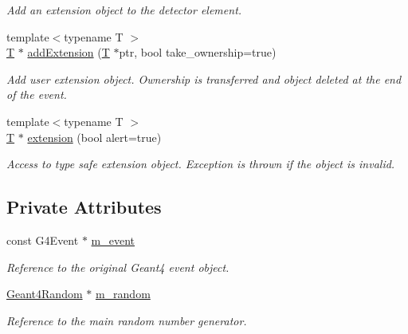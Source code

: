 \begin{DoxyCompactItemize}
\begin{DoxyCompactList}\small\item\em Add an extension object to the detector element. \end{DoxyCompactList}\item 
{\footnotesize template$<$typename T $>$ }\\\hyperlink{class_t}{T} $\ast$ \hyperlink{class_d_d4hep_1_1_simulation_1_1_geant4_event_ab36b9e314cbcaa56851c712ba7d0db51}{add\+Extension} (\hyperlink{class_t}{T} $\ast$ptr, bool take\+\_\+ownership=true)
\begin{DoxyCompactList}\small\item\em Add user extension object. Ownership is transferred and object deleted at the end of the event. \end{DoxyCompactList}\item 
{\footnotesize template$<$typename T $>$ }\\\hyperlink{class_t}{T} $\ast$ \hyperlink{class_d_d4hep_1_1_simulation_1_1_geant4_event_a9484d88af250ffabccc8d717b6055ef7}{extension} (bool alert=true)
\begin{DoxyCompactList}\small\item\em Access to type safe extension object. Exception is thrown if the object is invalid. \end{DoxyCompactList}\end{DoxyCompactItemize}
\subsection*{Private Attributes}
\begin{DoxyCompactItemize}
\item 
const G4\+Event $\ast$ \hyperlink{class_d_d4hep_1_1_simulation_1_1_geant4_event_a1d336fefbd6316dc5373a3b2d362cffa}{m\+\_\+event}
\begin{DoxyCompactList}\small\item\em Reference to the original Geant4 event object. \end{DoxyCompactList}\item 
\hyperlink{class_d_d4hep_1_1_simulation_1_1_geant4_random}{Geant4\+Random} $\ast$ \hyperlink{class_d_d4hep_1_1_simulation_1_1_geant4_event_a0eb7e282d0f186db2a738cc3ac9e1718}{m\+\_\+random}
\begin{DoxyCompactList}\small\item\em Reference to the main random number generator. \end{DoxyCompactList}\end{DoxyCompactItemize}
